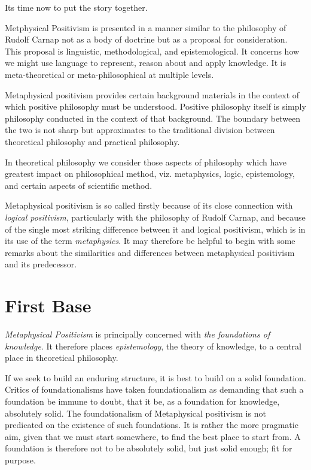 Its time now to put the story together.

Metphysical Positivism is presented in a manner similar to the philosophy of Rudolf Carnap not as a body of doctrine but as a proposal for consideration.
This proposal is linguistic, methodological, and epistemological.
It concerns how we might use language to represent, reason about and apply knowledge.
It is meta-theoretical or meta-philosophical at multiple levels.

Metaphysical positivism provides certain background materials in the
context of which positive philosophy must be understood.
Positive philosophy itself is simply philosophy conducted in the
context of that background.
The boundary between the two is not sharp but approximates to the
traditional division between theoretical philosophy and practical
philosophy.

In theoretical philosophy we consider those aspects of philosophy
which have greatest impact on philosophical method, viz. metaphysics,
logic, epistemology, and certain aspects of scientific method.

Metaphysical positivism is so called firstly because of its close
connection with \emph{logical positivism}, particularly with the
philosophy of Rudolf Carnap, and because of the single most striking
difference between it and logical positivism, which is in its use of
the term \emph{metaphysics}.
It may therefore be helpful to begin with some remarks about the
similarities and differences between metaphysical positivism and its
predecessor.

\section{First Base}

{\it Metaphysical Positivism} is principally concerned with {\it the
  foundations of knowledge}. 
It therefore places {\it epistemology}, the theory of knowledge, to a
central place in theoretical philosophy. 

If we seek to build an enduring structure, it is best to build on a
solid foundation. 
Critics of foundationalisms have taken foundationalism as demanding
that such a foundation be immune to doubt, that it be, as a foundation
for knowledge, absolutely solid.
The foundationalism of Metaphysical positivism is not predicated on
the existence of such foundations.
It is rather the more pragmatic aim, given that we must start
somewhere, to find the best place to start from.
A foundation is therefore not to be absolutely solid, but just solid
enough; fit for purpose.

